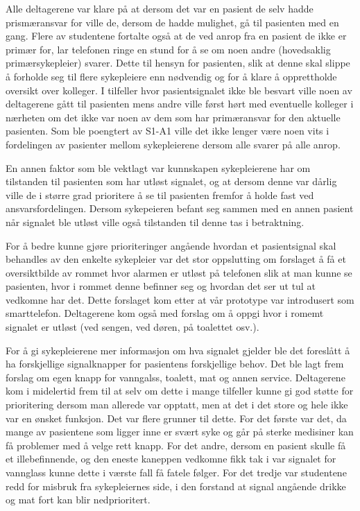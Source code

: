 \noindent
Alle deltagerene var klare på at dersom det var en pasient de selv hadde prismæransvar for ville de, dersom de hadde mulighet, gå til pasienten med en gang.
Flere av studentene fortalte også at de ved anrop fra en pasient de ikke er primær for, lar telefonen ringe en stund for å se om noen andre (hovedsaklig primærsykepleier) svarer. Dette til hensyn for pasienten, slik at denne skal slippe å forholde seg til flere sykepleiere enn nødvendig og for å klare å opprettholde oversikt over kolleger. I tilfeller hvor pasientsignalet ikke ble besvart ville noen av deltagerene gått til pasienten mens andre ville først hørt med eventuelle kolleger i nærheten om det ikke var noen av dem som har primæransvar for den aktuelle pasienten. Som ble poengtert av S1-A1 ville det ikke lenger være noen vits i fordelingen av pasienter mellom sykepleierene dersom alle svarer på alle anrop.

\noindent
En annen faktor som ble vektlagt var kunnskapen sykepleierene har om tilstanden til pasienten som har utløst signalet, og at dersom denne var dårlig ville de i større grad prioritere å se til pasienten fremfor å holde fast ved ansvarsfordelingen. 
Dersom sykepeieren befant seg sammen med en annen pasient når signalet ble utløst ville også tilstanden til denne tas i betraktning. 

\noindent
For å bedre kunne gjøre prioriteringer angående hvordan et pasientsignal skal behandles av den enkelte sykepleier var det stor oppslutting om forslaget å få et oversiktbilde av rommet hvor alarmen er utløst på telefonen slik at man kunne se pasienten, hvor i rommet denne befinner seg og hvordan det ser ut tul at vedkomne har det. Dette forslaget kom etter at vår prototype var introdusert som smarttelefon. Deltagerene kom også med forslag om å oppgi hvor i romemt signalet er utløst (ved sengen, ved døren, på toalettet osv.).

\noindent
For å gi sykepleierene mer informasjon om hva signalet gjelder ble det foreslått å ha forskjellige signalknapper for pasientens forskjellige behov. Det ble lagt frem forslag om egen knapp for vanngalss, toalett, mat og annen service. Deltagerene kom i midelertid frem til at selv om dette i mange tilfeller kunne gi god støtte for prioritering dersom man allerede var opptatt, men at det i det store og hele ikke var en ønsket funksjon. Det var flere grunner til dette. For det første var det, da mange av pasientene som ligger inne er svært syke og går på sterke medisiner kan få problemer med å velge rett knapp. For det andre, dersom en pasient skulle få et illebefinnende, og den eneste kaneppen vedkomne fikk tak i var signalet for vannglass kunne dette i værste fall få fatele følger. For det tredje var studentene redd for misbruk fra sykepleiernes side, i den forstand at signal angående drikke og mat fort kan blir nedprioritert. 

